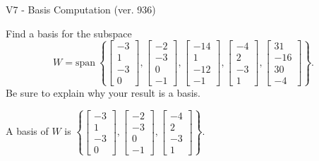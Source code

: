 \begin{exercise}
  \begin{exerciseTitle}V7 - Basis Computation (ver. 936)\end{exerciseTitle}
  \begin{exerciseStatement}
    Find a basis for the subspace 
\[W=\mathrm{span}\ \left\{\left[\begin{array}{r}
-3 \\
1 \\
-3 \\
0
\end{array}\right] , \left[\begin{array}{r}
-2 \\
-3 \\
0 \\
-1
\end{array}\right] , \left[\begin{array}{r}
-14 \\
1 \\
-12 \\
-1
\end{array}\right] , \left[\begin{array}{r}
-4 \\
2 \\
-3 \\
1
\end{array}\right] , \left[\begin{array}{r}
31 \\
-16 \\
30 \\
-4
\end{array}\right]\right\}.\]
 Be sure to explain why your result is a basis.


  \end{exerciseStatement}
  \begin{exerciseAnswer}
   A basis of \(W\) is  \(\left\{\left[\begin{array}{r}
-3 \\
1 \\
-3 \\
0
\end{array}\right] , \left[\begin{array}{r}
-2 \\
-3 \\
0 \\
-1
\end{array}\right] , \left[\begin{array}{r}
-4 \\
2 \\
-3 \\
1
\end{array}\right]\right\}\).
  


  \end{exerciseAnswer}
\end{exercise}
